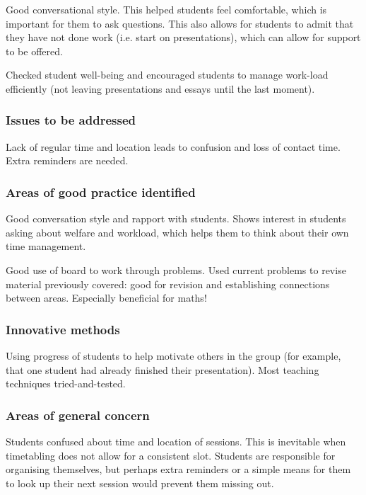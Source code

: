 Good conversational style. This helped students feel comfortable, which is important for them to ask questions. This also allows for students to admit that they have not done work (i.e. start on presentations), which can allow for support to be offered.

Checked student well-being and encouraged students to manage work-load efficiently (not leaving presentations and essays until the last moment).

\subsubsection{Issues to be addressed}

Lack of regular time and location leads to confusion and loss of contact time. Extra reminders are needed.

\subsubsection{Areas of good practice identified}

Good conversation style and rapport with students. Shows interest in students asking about welfare and workload, which helps them to think about their own time management.

Good use of board to work through problems. Used current problems to revise material previously covered: good for revision and establishing connections between areas. Especially beneficial for maths!

\subsubsection{Innovative methods}\label{sec:other-tutorial-innovative}

Using progress of students to help motivate others in the group (for example, that one student had already finished their presentation). Most teaching techniques tried-and-tested.

\subsubsection{Areas of general concern}\label{sec:other-tutorial-concern}

Students confused about time and location of sessions. This is inevitable when timetabling does not allow for a consistent slot. Students are responsible for organising themselves, but perhaps extra reminders or a simple means for them to look up their next session would prevent them missing out.

